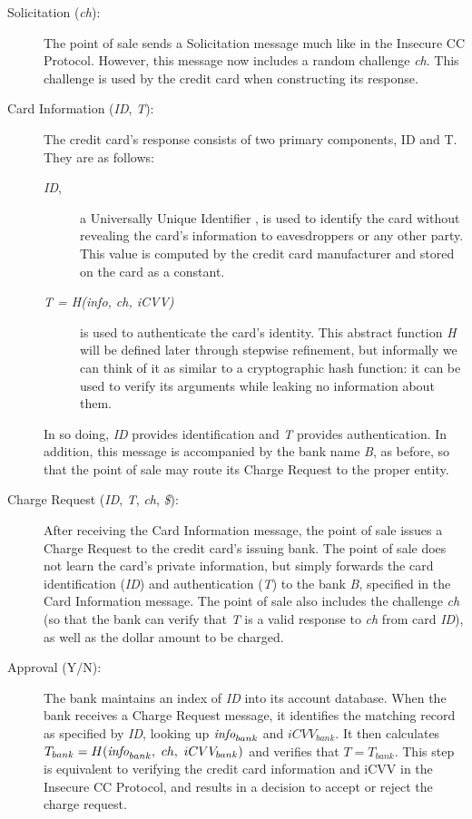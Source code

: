 \begin{description}
\item[Solicitation (\emph{ch}):]
The point of sale sends a Solicitation message much like in the Insecure CC Protocol.
However, this message now includes a random challenge \emph{ch}.
This challenge is used by the credit card when constructing its response.

\item[Card Information (\emph{ID}, \emph{T}):]
The credit card's response consists of two primary components, ID and T. They are as follows:

\begin{description}
\item[\emph{ID},]a Universally Unique Identifier \cite{uuid}, is used to identify the card without revealing the card's information to eavesdroppers or any other party.
This value is computed by the credit card manufacturer and stored on the card as a constant.

\item[\emph{T = H(info, ch, iCVV)}] is used to authenticate the card's identity.
This abstract function \emph{H} will be defined later through stepwise refinement, but informally we can think of it as similar to a cryptographic hash function:
	it can be used to verify its arguments while leaking no information about them.
\end{description}

In so doing, \emph{ID} provides identification and \emph{T} provides authentication.
In addition, this message is accompanied by the bank name \emph{B}, as before, so that the point of sale may route its Charge Request to the proper entity.

\item[Charge Request (\emph{ID}, \emph{T}, \emph{ch}, \emph{\$}):]
After receiving the Card Information message, the point of sale issues a Charge Request to the credit card's issuing bank.
The point of sale does not learn the card's private information, but simply forwards the card identification (\emph{ID}) and authentication (\emph{T}) to the bank \emph{B},
    specified in the Card Information message.
The point of sale also includes the challenge \emph{ch}
	(so that the bank can verify that \emph{T} is a valid response to \emph{ch} from card \emph{ID}),
	as well as the dollar amount to be charged.

\item[Approval (Y/N):]
The bank maintains an index of \emph{ID} into its account database.
When the bank receives a Charge Request message, it identifies the matching record as specified by \emph{ID}, looking up $\textrm{\emph{info}}_{bank}$ and $iCVV_{bank}$.
It then calculates $T_{bank} = H(\textrm{\emph{info}}_{bank},~ ch,~ iCVV_{bank})$ and verifies that $T = T_{bank}$.
This step is equivalent to verifying the credit card information and iCVV in the Insecure CC Protocol,
	and results in a decision to accept or reject the charge request.

\end{description}





